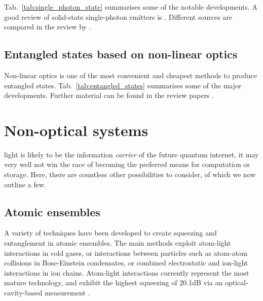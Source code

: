 Tab.~\ref{tab:single_photon_state} summarises some of the notable developments. A good review of solid-state single-photon emitters is \cite{bib:aharonovich2016solid}. Different sources are compared in the review by \cite{bib:eisaman2011}.

%
%

\subsection{Entangled states based on non-linear optics} 

Non-linear optics is one of the most convenient and cheapest methods to produce entangled states. Tab.~\ref{tab:entangled_states} summarises some of the major developments. Further material can be found in the review papers \cite{bib:pan2012multiphoton, bib:ralph2009bright}.

%
%

\section{Non-optical systems}

 light is likely to be the information \textit{carrier} of the future quantum internet, it may very well not win the race of becoming the preferred means for computation or storage. Here, there are countless other possibilities to consider, of which we now outline a few.

%
%

\subsection{Atomic ensembles} 

A variety of techniques have been developed to create squeezing and entanglement in atomic ensembles. The main methods exploit atom-light interactions in cold gases, or interactions between particles such as atom-atom collisions in Bose-Einstein condensates, or combined electrostatic and ion-light interactions in ion chains. Atom-light interactions currently represent the most mature technology, and exhibit the highest squeezing of 20.1dB via an optical-cavity-based measurement \cite{bib:hosten2016measurement}.

